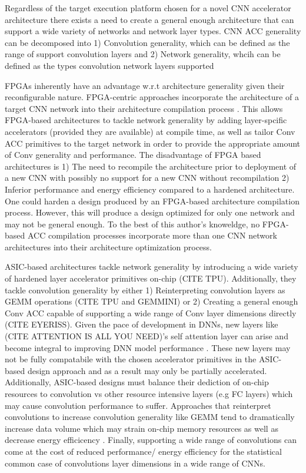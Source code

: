 Regardless of the target execution platform chosen for a novel \ac{CNN}
accelerator architecture there exists a need to create a general enough
architecture that can support a wide variety of networks and network layer
types. \ac{CNN} \ac{ACC} generality can be decomposed into 1) Convolution
generality, which can be defined as the range of support convolution layers and
2) Network generality, whcih can be defined as the types convolution network
layers supported 

\ac{FPGA}s inherently have an advantage w.r.t architecture generality given
their reconfigurable nature. \ac{FPGA}-centric approaches incorporate the
architecture of a target \ac{CNN} network into their architecture compilation
process \cite{caffeine}. This allows \ac{FPGA}-based architectures to tackle
network generality by adding layer-spcific accelerators (provided they are
available) at compile time, as well as tailor \ac{Conv} \ac{ACC} primitives to
the target network in order to provide the appropriate amount of \ac{Conv}
generality and performance. The disadvantage of \ac{FPGA} based architectures is
1) The need to recompile the architecture prior to deployment of a new \ac{CNN}
with possibly no support for a new \ac{CNN} without recompilation 2) Inferior performance and energy
efficiency compared to a hardened architecture. One could harden a design
produced by an \ac{FPGA}-based architecture compilation process. However, this
will produce a design optimized for only one network and may not be general
enough. To the best of this author's knoweldge, no \ac{FPGA}-based \ac{ACC}
compilation processes incorporate more than one \ac{CNN} network architectures
into their architecture optimization process. 

\ac{ASIC}-based architectures tackle network generality by introducing a wide
variety of hardened layer accelerator primitives on-chip (CITE TPU).
Additionally, they tackle convolution generality by either 1) Reinterpreting
convolution layers as \ac{GEMM} operations (CITE TPU and GEMMINI) or 2) Creating a general
enough \ac{Conv} \ac{ACC} capable of supporting a wide range of \ac{Conv} layer
dimensions directly (CITE EYERISS). Given the pace of development in \ac{DNN}s,
new layers like (CITE ATTENTION IS ALL YOU NEED)'s self attention layer can
arise and become integral to improving \ac{DNN} model performance
\cite{conv_and_transformers}. These new layers may not be fully compatabile with
the chosen accelerator primitives in the \ac{ASIC}-based design approach and as
a result may only be partially accelerated. Additionally, \ac{ASIC}-based
designs must balance their dediction of on-chip resources to convolution vs
other resource intensive layers (e.g \ac{FC} layers) which may cause convolution
performance to suffer. Approaches that reinterpret convolutions to increase
convolution generality like \ac{GEMM} tend to dramatically increase data volume
which may strain on-chip memory resources as well as decrease energy efficicency
\cite{caffeine}. Finally, supporting a wide range of convolutions can come at
the cost of reduced performance/ energy efficiency for the statistical common
case of convolutions layer dimensions in a wide range of \ac{CNN}s.  



